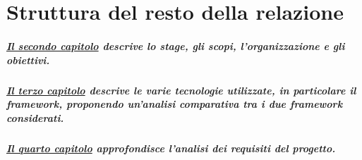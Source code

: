 \section{Struttura del resto della relazione}
\subparagraph{\hyperref[cap2]{Il secondo capitolo} descrive lo stage, gli scopi, l'organizzazione e gli obiettivi.}

\subparagraph{\hyperref[cap3]{Il terzo capitolo} descrive le varie tecnologie utilizzate, in particolare il framework, proponendo un'analisi comparativa tra i due framework considerati.}

\subparagraph{\hyperref[cap4]{Il quarto capitolo} approfondisce l'analisi dei requisiti del progetto.}


